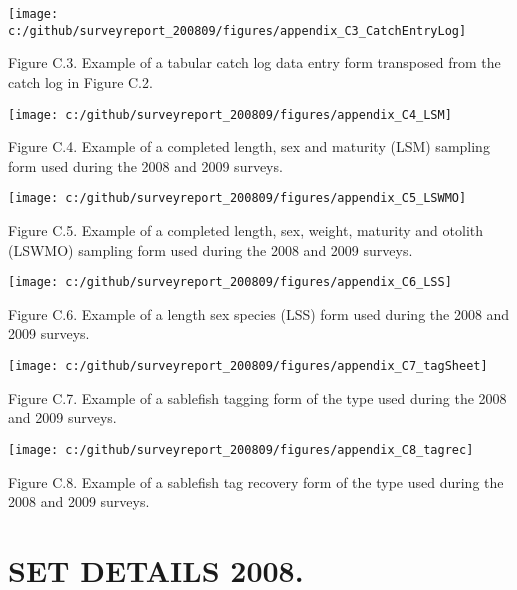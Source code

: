 \documentclass[12pt]{article}\usepackage[]{graphicx}\usepackage[]{color}
\begin{document}
\begin{appendices}
\clearpage
\begin{center}\texttt{[image: c:/github/surveyreport\_200809/figures/appendix\_C3\_CatchEntryLog]} \end{center}

Figure C.3. Example of a tabular catch log data entry form transposed from the catch log in Figure C.2.

\clearpage
\begin{center}\texttt{[image: c:/github/surveyreport\_200809/figures/appendix\_C4\_LSM]} \end{center}

Figure C.4. Example of a completed length, sex and maturity (LSM) sampling form used during the 2008 and 2009 surveys.
\begin{center}\texttt{[image: c:/github/surveyreport\_200809/figures/appendix\_C5\_LSWMO]} \end{center}

Figure C.5. Example of a completed length, sex, weight, maturity and otolith (LSWMO) sampling form used during the 2008 and 2009 surveys. \clearpage
\begin{flushleft}\texttt{[image: c:/github/surveyreport\_200809/figures/appendix\_C6\_LSS]} \end{flushleft}

Figure C.6. Example of a length sex species (LSS) form used during the 2008 and 2009 surveys.

\clearpage
\begin{flushleft}\texttt{[image: c:/github/surveyreport\_200809/figures/appendix\_C7\_tagSheet]} \end{flushleft}

Figure C.7. Example of a sablefish tagging form of the type used during the 2008 and 2009 surveys.

\clearpage
\begin{flushleft}\texttt{[image: c:/github/surveyreport\_200809/figures/appendix\_C8\_tagrec]} \end{flushleft}

Figure C.8. Example of a sablefish tag recovery form of the type used during the 2008 and 2009 surveys.

\clearpage

\section{SET DETAILS 2008.}
\label{app:fourth-appendix}


\end{appendices}
\end{document}
